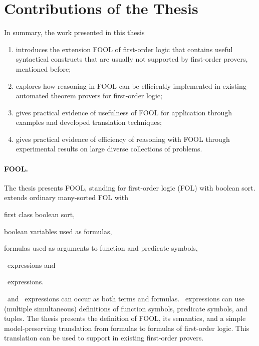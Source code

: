 \section*{Contributions of the Thesis}
\label{sect:intro:contributions}

In summary, the work presented in this thesis
\begin{enumerate}
  \item introduces the extension FOOL of first-order logic that contains useful syntactical constructs that are usually not supported by first-order provers, mentioned before;
  \item explores how reasoning in FOOL can be efficiently implemented in existing automated theorem provers for first-order logic;
  \item gives practical evidence of usefulness of FOOL for application through examples and developed translation techniques;
  \item gives practical evidence of efficiency of reasoning with FOOL through experimental results on large diverse collections of problems.
\end{enumerate}

\paragraph{FOOL.}
The thesis presents FOOL, standing for first-order logic (FOL) with boolean sort. \folb{} extends ordinary many-sorted FOL with \begin{enumerate*}[label=(\roman*)]\item first class boolean sort, \item boolean variables used as formulas, \item formulas used as arguments to function and predicate symbols, \item \ITE\ expressions and \item \LETIN\ expressions.\end{enumerate*} \ITE\ and \LETIN\ expressions can occur as both terms and formulas. \LETIN\ expressions can use (multiple simultaneous) definitions of function symbols, predicate symbols, and tuples. The thesis presents the definition of FOOL, its semantics, and a simple model-preserving translation from \folb{} formulas to formulas of first-order logic. This translation can be used to support \folb{} in existing first-order provers.

